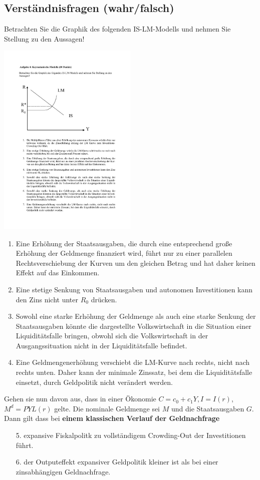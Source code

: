\documentclass{scrartcl}
\begin{document}
\subsection{Verst\"{a}ndnisfragen (wahr/falsch)}
Betrachten Sie die Graphik des folgenden IS-LM-Modells und nehmen Sie
Stellung zu den Aussagen!\\
\begin{center}\includegraphics[width=0.5\textwidth]{Bilder/ISLM2.pdf}\end{center}
\begin{enumerate}
  \item Eine Erh\"{o}hung der Staatsausgaben, die durch eine entsprechend
      gro{\ss}e Erh\"{o}hung der Geldmenge finanziert wird, f\"{u}hrt nur zu einer
      parallelen Rechtsverschiebung der Kurven um den gleichen Betrag und
      hat daher keinen Effekt auf das Einkommen. %
  \item Eine stetige Senkung von Staatsausgaben und autonomen
      Investitionen kann den Zins nicht unter $R_0$ dr\"{u}cken. %
  \item Sowohl eine starke Erh\"{o}hung der Geldmenge als auch eine starke
      Senkung der Staatsausgaben k\"{o}nnte die dargestellte Volkswirtschaft
      in die Situation einer Liquidit\"{a}tsfalle bringen, obwohl sich die
      Volkswirtschaft in der Ausgangssituation nicht in der
      Liquidit\"{a}tsfalle befindet. %
  \item Eine Geldmengenerh\"{o}hung verschiebt die LM-Kurve nach rechts,
      nicht nach rechts unten. Daher kann der minimale Zinssatz, bei dem
      die Liquidit\"{a}tsfalle einsetzt, durch Geldpolitik nicht ver\"{a}ndert
      werden. %
\end{enumerate}
Gehen sie nun davon aus, dass in einer \"{O}konomie $C=c_0+c_1 Y, I=I(r)$, $M^d=P Y L(r)$ gelte. Die nominale Geldmenge sei $M$ und die Staatsausgaben $G$. Dann gilt dass bei \textbf{einem klassischen Verlauf der Geldnachfrage}
\begin{enumerate}
  \item[5.] expansive Fiskalpolitk zu vollst\"{a}ndigem Crowding-Out der Investitionen f\"{u}hrt.%
\item[6.] der Outputeffekt expansiver Geldpolitik kleiner ist als bei einer zinsabh\"{a}ngigen Geldnachfrage. %
\end{enumerate}
\end{document}

